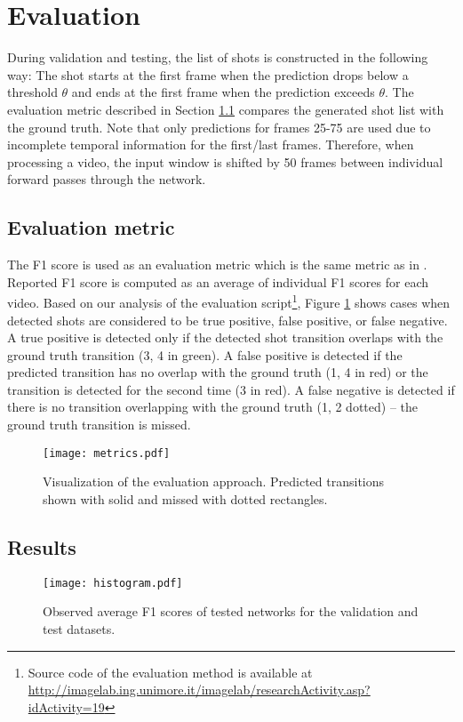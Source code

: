 \section{Evaluation}
During validation and testing, the list of shots is constructed in the following way: The shot starts at the first frame when the prediction drops below a threshold $\theta$ and ends at the first frame when the prediction exceeds $\theta$. The evaluation metric described in Section \ref{sec:eval_met} compares the generated shot list with the ground truth. Note that only predictions for frames 25-75 are used due to incomplete temporal information for the first/last frames. Therefore, when processing a video, the input window is shifted by 50 frames between individual forward passes through the network.

\subsection{Evaluation metric}
\label{sec:eval_met}
The F1 score is used as an evaluation metric which is the same metric as in \cite{Baraldi15}. Reported F1 score is computed as an average of individual F1 scores for each video. Based on our analysis of the evaluation script\footnote{Source code of the evaluation method is available at \url{http://imagelab.ing.unimore.it/imagelab/researchActivity.asp?idActivity=19}}, Figure \ref{fig:metricVis} shows cases when detected shots are considered to be true positive, false positive, or false negative. A true positive is detected only if the detected shot transition overlaps with the ground truth transition (3, 4 in green). A false positive is detected if the predicted transition has no overlap with the ground truth (1, 4 in red) or the transition is detected for the second time (3 in red). A false negative is detected if there is no transition overlapping with the ground truth (1, 2 dotted) -- the ground truth transition is missed.


\begin{figure}[ht]
    \centering
    \texttt{[image: metrics.pdf]}
    \caption{Visualization of the evaluation approach. \textmd{Predicted transitions shown with solid and missed with dotted rectangles.}}
    \label{fig:metricVis}
\end{figure}

\subsection{Results}
\begin{figure}
    \centering
    \texttt{[image: histogram.pdf]}
    \caption{Observed average F1 scores of tested networks for the validation and test datasets.}
    \label{fig:F1scores}
\end{figure}

